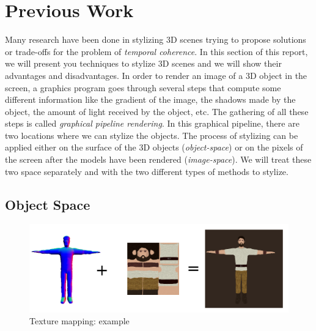 \chapter{Previous Work}

Many research have been done in stylizing 3D scenes\cite{schmid_overcoat:_2011, praun_real-time_2001, klein_non-photorealistic_2000, benard_dynamic_2009, benard_dynamic_2010, freudenberg_walk-through_2001, benard_state---art_2011} trying to propose solutions or trade-offs for the problem of \textit{temporal coherence}. In this section of this report, we will present you techniques to stylize 3D scenes and we will show their advantages and disadvantages. In order to render an image of a 3D object in the screen, a graphics program goes through several steps that compute some different information like the gradient of the image, the shadows made by the object, the amount of light received by the object, etc. The gathering of all these steps is called \textit{graphical pipeline rendering}. In this graphical pipeline, there are two locations where we can stylize the objects. The process of stylizing can be applied either on the surface of the 3D objects (\textit{object-space}) or on the pixels of the screen after the models have been rendered (\textit{image-space}). We will treat these two space separately and with the two different types of methods to stylize.



\section{Object Space}


\begin{figure}[H]
    \begin{center}
    \includegraphics[scale=0.4]{pics/texture_mapping.png}
    \end{center}
    \caption{Texture mapping: example}
    \label{texture_mapping}
\end{figure}

